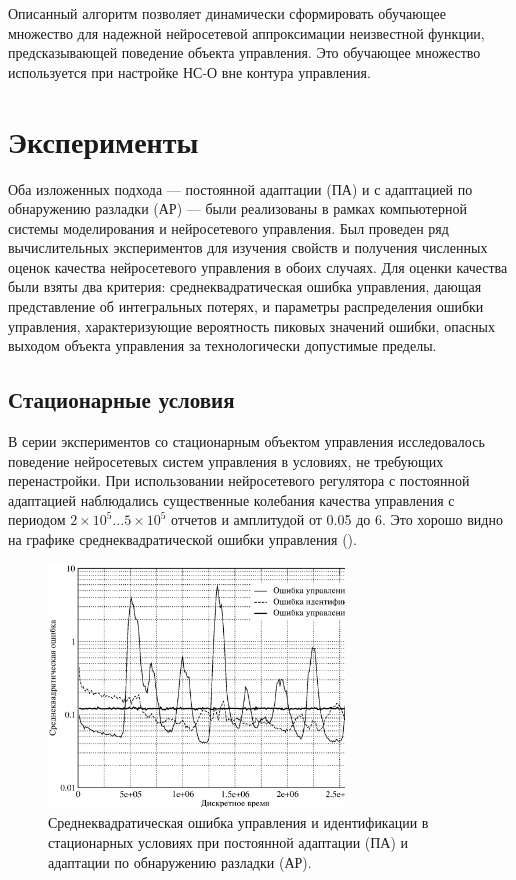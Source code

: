 Описанный алгоритм позволяет динамически сформировать обучающее
множество для надежной нейросетевой аппроксимации неизвестной функции,
предсказывающей поведение объекта управления.  Это обучающее множество
используется при настройке НС-О вне контура управления.

\section{Эксперименты}

Оба изложенных подхода --- постоянной адаптации (ПА) и с адаптацией по
обнаружению разладки (АР) --- были реализованы в рамках компьютерной
системы моделирования и нейросетевого управления.  Был проведен ряд
вычислительных экспериментов для изучения свойств и получения
численных оценок качества нейросетевого управления в обоих случаях.
Для оценки качества были взяты два критерия: среднеквадратическая
ошибка управления, дающая представление об интегральных потерях, и
параметры распределения ошибки управления, характеризующие вероятность
пиковых значений ошибки, опасных выходом объекта управления за
технологически допустимые пределы.

\subsection{Стационарные условия}

В серии экспериментов со стационарным объектом управления
исследовалось поведение нейросетевых систем управления в условиях, не
требующих перенастройки.  При использовании нейросетевого регулятора с
постоянной адаптацией наблюдались существенные колебания качества
управления с периодом $2\times 10^5...5\times 10^5$ отчетов и
амплитудой от 0.05 до 6. Это хорошо видно на графике
среднеквадратической ошибки управления
().

\begin{figure}[h]
\centering
\includegraphics[width=0.7\textwidth,%
  totalheight=0.3\textheight]{perm_adopt_steady_plant_rus}
\caption{Среднеквадратическая ошибка управления и идентификации в
  стационарных условиях при постоянной адаптации (ПА) и адаптации по
  обнаружению разладки (АР).}
\label{fig:steady_plant_errors}
\end{figure}

